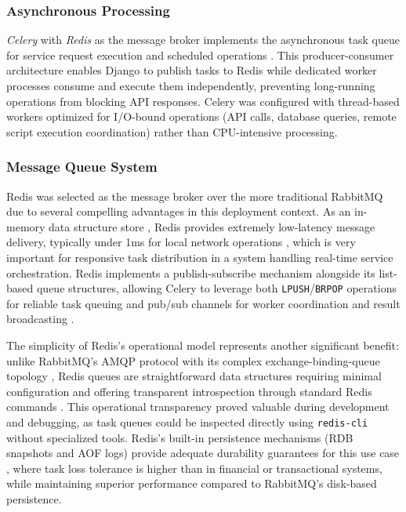 \subsubsection{Asynchronous Processing}

\textit{Celery} with \textit{Redis} as the message broker implements the asynchronous task queue for service request execution and scheduled operations \cite{celery}. This producer-consumer architecture enables Django to publish tasks to Redis while dedicated worker processes consume and execute them independently, preventing long-running operations from blocking API responses. Celery was configured with thread-based workers optimized for I/O-bound operations (API calls, database queries, remote script execution coordination) rather than CPU-intensive processing.

\subsubsection{Message Queue System}
Redis was selected as the message broker over the more traditional RabbitMQ due to several compelling advantages in this deployment context. As an in-memory data structure store \cite{carlson2013redis}, Redis provides extremely low-latency message delivery, typically under 1ms for local network operations \cite{carlson2013redis}, which is very important for responsive task distribution in a system handling real-time service orchestration. Redis implements a publish-subscribe mechanism alongside its list-based queue structures, allowing Celery to leverage both \texttt{LPUSH}/\texttt{BRPOP} operations for reliable task queuing and pub/sub channels for worker coordination and result broadcasting \cite{carlson2013redis} \cite{redis_kafka_rabbitmq_comparison}.

The simplicity of Redis's operational model represents another significant benefit: unlike RabbitMQ's AMQP protocol with its complex exchange-binding-queue topology \cite{amqp}, Redis queues are straightforward data structures requiring minimal configuration and offering transparent introspection through standard Redis commands \cite{carlson2013redis}. This operational transparency proved valuable during development and debugging, as task queues could be inspected directly using \texttt{redis-cli} without specialized tools. Redis's built-in persistence mechanisms (RDB snapshots and AOF logs) provide adequate durability guarantees for this use case \cite{carlson2013redis}, where task loss tolerance is higher than in financial or transactional systems, while maintaining superior performance compared to RabbitMQ's disk-based persistence.

